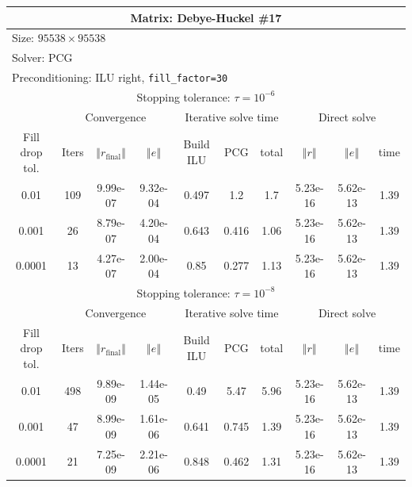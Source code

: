 \documentclass[oneside,final]{amsart}  %
\begin{document}
\begin{tabular}{|c|c|c|c|c|c|c|c|c|c|}
\hline
\multicolumn{10}{|c|}{Matrix: Debye-Huckel \#17}\tabularnewline
\hline
  \multicolumn{10}{|l|}{Size: $95538\times95538$}\tabularnewline
\hline
\multicolumn{10}{|l|}{Solver: PCG}\tabularnewline
\hline
\multicolumn{10}{|l|}{Preconditioning: ILU right, \texttt{fill\_factor=30}}\tabularnewline
\hline
\hline
\multicolumn{10}{|c|}{Stopping tolerance: $\tau=10^{-6}$}\tabularnewline
\hline
\hline
 & \multicolumn{3}{c|}{Convergence} & \multicolumn{3}{c|}{Iterative solve time} & \multicolumn{3}{c|}{Direct solve}\tabularnewline
\hline
Fill drop tol.  & Iters & $\left\Vert r_{\text{final}}\right\Vert $  & $\left\Vert e\right\Vert $  & Build ILU  & PCG  & total  & $\left\Vert r\right\Vert $ & $\left\Vert e\right\Vert $  & time\tabularnewline
\hline
  0.01 & 109 & 9.99e-07 & 9.32e-04 &      0.497 &        1.2 &        1.7 & 5.23e-16 & 5.62e-13 &       1.39\\
  \hline
  0.001 & 26 & 8.79e-07 & 4.20e-04 &      0.643 &      0.416 &       1.06 & 5.23e-16 & 5.62e-13 &       1.39\\
  \hline
  0.0001 & 13 & 4.27e-07 & 2.00e-04 &       0.85 &      0.277 &       1.13 & 5.23e-16 & 5.62e-13 &       1.39\\
  \hline
\hline
\multicolumn{10}{|c|}{Stopping tolerance: $\tau=10^{-8}$}\tabularnewline
\hline
\hline
 & \multicolumn{3}{c|}{Convergence} & \multicolumn{3}{c|}{Iterative solve time} & \multicolumn{3}{c|}{Direct solve }\tabularnewline
\hline
Fill drop tol.  & Iters  & $\left\Vert r_{\text{final}}\right\Vert $  & $\left\Vert e\right\Vert $ & Build ILU  & PCG  & total  & $\left\Vert r\right\Vert $  & $\left\Vert e\right\Vert $  & time\tabularnewline
\hline
  0.01 & 498 & 9.89e-09 & 1.44e-05 &       0.49 &       5.47 &       5.96 & 5.23e-16 & 5.62e-13 &       1.39\\
  \hline
  0.001 & 47 & 8.99e-09 & 1.61e-06 &      0.641 &      0.745 &       1.39 & 5.23e-16 & 5.62e-13 &       1.39\\
  \hline
  0.0001 & 21 & 7.25e-09 & 2.21e-06 &      0.848 &      0.462 &       1.31 & 5.23e-16 & 5.62e-13 &       1.39\\
  \hline
\end{tabular}
\end{document}
